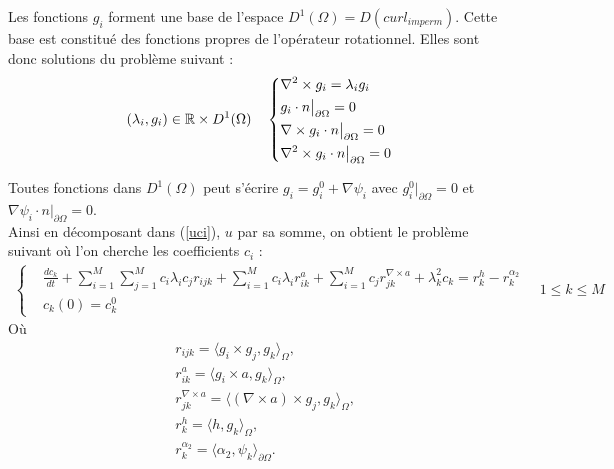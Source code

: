 Les fonctions $g_i$ forment une base de l'espace $D^1(\Omega) = D(curl_{imperm})$. Cette base est constitué des fonctions propres de l'opérateur rotationnel. Elles sont donc solutions du problème suivant :
\begin{eqnarray}
\label{curlcurl}
(\lambda_i,g_i)\in{\mathbb{R}}\times D^1(\Omega)\quad \left\{
\begin{aligned}
&\nabla^2\times  g_i = \lambda_i g_i\\
&g_i\cdot n\big\rvert_{\partial\Omega} = 0\\
&\nabla\times g_i\cdot n\big\rvert_{\partial\Omega} = 0\\
&\nabla^2\times  g_i\cdot n\big\rvert_{\partial\Omega} = 0
\end{aligned}
\right.
\end{eqnarray}

Toutes fonctions dans $D^1(\Omega)$ peut s'écrire $g_i=g_i^0+\nabla\psi_i$ avec $g_i^0\big\rvert_{\partial\Omega} = 0$ et $ \nabla\psi_i\cdot n\big\rvert_{\partial\Omega} = 0$.\\
Ainsi en décomposant dans (\ref{uci}), $u$ par sa somme, on obtient le problème suivant où l'on cherche les coefficients $c_i$ :\\
\begin{eqnarray}
\label{cigi}
\left\{
\begin{aligned}
&\frac{dc_k}{dt}+\sum_{i=1}^M\sum_{j=1}^M c_i\lambda_i c_j r_{ijk} + \sum_{i=1}^M c_i\lambda_i r_{ik}^a + \sum_{i=1}^M c_j r_{jk}^{\nabla\times a} + \lambda_k^2 c_k = r_k^h - r_k^{\alpha_2}\\
&c_k(0)=c_k^0
\end{aligned}
\right.\quad
1\leq k\leq M
\end{eqnarray}
Où\\
\[
\begin{aligned}
&r_{ijk} = \langle g_i\times g_j, g_k\rangle_\Omega,\\
&r_{ik}^a=\langle g_i\times a, g_k\rangle_\Omega,\\
&r_{jk}^{\nabla\times a}=\langle (\nabla\times a)\times g_j, g_k\rangle_\Omega,\\
&r_k^h=\langle h,g_k\rangle_\Omega,\\
&r_k^{\alpha_2} = \langle \alpha_2,\psi_k\rangle_{\partial\Omega}.
\end{aligned}
\]

